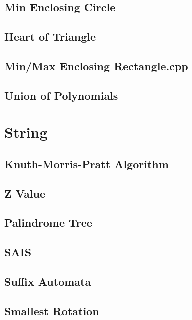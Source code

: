 \documentclass[a4paper,10pt,twocolumn,oneside]{article}
\begin{document}
\subsection{Min Enclosing Circle}

\subsection{Heart of Triangle}

\subsection{Min/Max Enclosing Rectangle.cpp}

\subsection{Union of Polynomials}


\section{String}
\subsection{Knuth-Morris-Pratt Algorithm}

\subsection{Z Value}

\subsection{Palindrome Tree}

\subsection{SAIS}

\subsection{Suffix Automata}

\subsection{Smallest Rotation}

\end{document}
